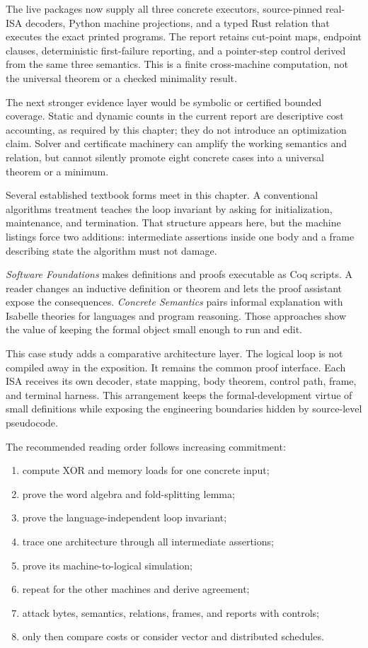 The live packages now supply all three concrete executors, source-pinned real-
ISA decoders, Python machine projections, and a typed Rust relation that
executes the exact printed programs. The report retains cut-point maps,
endpoint clauses, deterministic first-failure reporting, and a pointer-step
control derived from the same three semantics. This is a finite cross-machine
computation, not the universal theorem or a checked minimality result.

The next stronger evidence layer would be symbolic or certified bounded
coverage. Static and dynamic counts in the current report are descriptive cost
accounting, as required by this chapter; they do not introduce an optimization
claim. Solver and certificate machinery can amplify the working semantics and
relation, but cannot silently promote eight concrete cases into a universal
theorem or a minimum.

Several established textbook forms meet in this chapter. A conventional
algorithms treatment teaches the loop invariant by asking for initialization,
maintenance, and termination. That structure appears here, but the machine
listings force two additions: intermediate assertions inside one body and a
frame describing state the algorithm must not damage.

\emph{Software Foundations} makes definitions and proofs executable as Coq
scripts. A reader changes an inductive definition or theorem and lets the
proof assistant expose the consequences. \emph{Concrete Semantics} pairs
informal explanation with Isabelle theories for languages and program
reasoning. \autocite{pierce2026softwarefoundations,nipkow2014concretesemantics}
Those approaches show the value of keeping the formal object small enough to
run and edit.

This case study adds a comparative architecture layer. The logical loop is
not compiled away in the exposition. It remains the common proof interface.
Each ISA receives its own decoder, state mapping, body theorem, control path,
frame, and terminal harness. This arrangement keeps the formal-development
virtue of small definitions while exposing the engineering boundaries hidden
by source-level pseudocode.

The recommended reading order follows increasing commitment:

\begin{enumerate}
\item compute XOR and memory loads for one concrete input;
\item prove the word algebra and fold-splitting lemma;
\item prove the language-independent loop invariant;
\item trace one architecture through all intermediate assertions;
\item prove its machine-to-logical simulation;
\item repeat for the other machines and derive agreement;
\item attack bytes, semantics, relations, frames, and reports with controls;
\item only then compare costs or consider vector and distributed schedules.
\end{enumerate}

